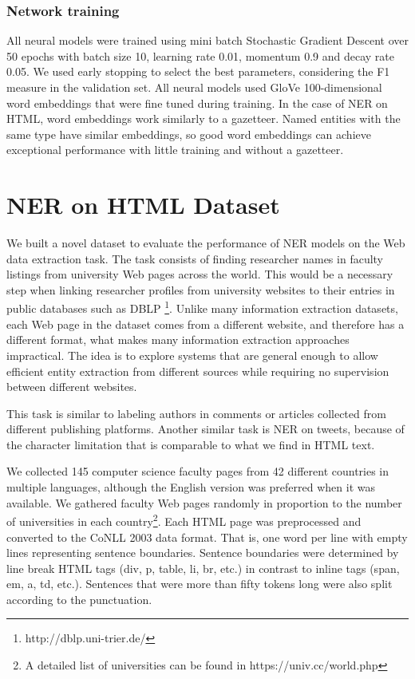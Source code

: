 \documentclass{nle}
\begin{document}
\subsubsection{Network training}

All neural models were trained using mini batch Stochastic Gradient Descent over 50 epochs with batch size 10,
learning rate 0.01, momentum 0.9 and decay rate 0.05. We used early stopping \cite{Caruana2000} to select the best 
parameters, considering the F1 measure in the validation set. All neural models used 
GloVe 100-dimensional word embeddings \cite{Pennington2014} that were fine tuned during training.
In the case of NER on HTML, word embeddings work similarly to a gazetteer. Named entities 
with the same type have similar embeddings, so good word embeddings can achieve exceptional 
performance with little training and without a gazetteer. 

\section{NER on HTML Dataset}
\label{sec:ner_dataset}

We built a novel dataset to evaluate the performance of NER models
on the Web data extraction task. The task consists of finding researcher
names in faculty listings from university Web pages across the world. This would be a
necessary step when linking researcher profiles from university websites to their entries
in public databases such as DBLP \footnote{http://dblp.uni-trier.de/}. Unlike many
information extraction datasets, each Web page in the dataset comes from a different 
website, and therefore has a different format, what makes many information
extraction approaches impractical. The idea is to explore systems that are general 
enough to allow efficient entity extraction from different sources while requiring
no supervision between different websites. 

This task is similar to labeling authors in comments or articles collected
from different publishing platforms. Another similar task is NER on tweets,
because of the character limitation that is comparable to what we find in 
HTML text.

We collected 145 computer science faculty pages from 42 different countries in
multiple languages, although the English version was preferred when it was available.
We gathered faculty Web pages randomly in proportion to
the number of universities in each country\footnote{A detailed list of universities can
be found in https://univ.cc/world.php}. Each HTML page was preprocessed and converted
to the CoNLL 2003 data format. That is, one word per line with empty lines representing
sentence boundaries. Sentence boundaries were determined by line break HTML tags
(div, p, table, li, br, etc.) in contrast to inline tags (span, em, a, td, etc.). 
Sentences that were more than fifty tokens long were also split according to the
punctuation.
\end{document}
